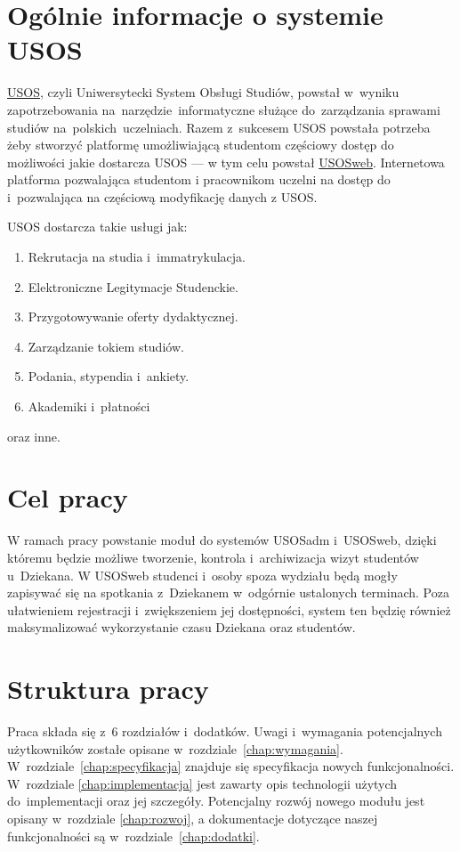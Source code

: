 \documentclass[licencjacka]{pracamgr}
\begin{document}
\section{Ogólnie informacje o systemie USOS}
\href{http://usos.edu.pl}{USOS}, czyli Uniwersytecki System Obsługi Studiów, powstał w~wyniku zapotrzebowania na~narzędzie~informatyczne służące do~zarządzania sprawami studiów na~polskich~uczelniach. Razem z~sukcesem USOS powstała potrzeba żeby stworzyć platformę umożliwiającą studentom częściowy dostęp do możliwości jakie dostarcza USOS --- w tym celu powstał \href{htpp://usosweb.uw.edu.pl}{USOSweb}. Internetowa platforma pozwalająca studentom i pracownikom uczelni na dostęp do i~pozwalająca na częściową modyfikację danych z USOS.

USOS dostarcza takie usługi jak:
\begin{enumerate}
\item Rekrutacja na studia i~immatrykulacja.
\item Elektroniczne Legitymacje Studenckie.
\item Przygotowywanie oferty dydaktycznej. 
\item Zarządzanie tokiem studiów.
\item Podania, stypendia i~ankiety.
\item Akademiki i~płatności
\end{enumerate}
oraz inne.

\section{Cel pracy}
W ramach pracy powstanie moduł do systemów USOSadm i~USOSweb, dzięki któremu będzie możliwe tworzenie, kontrola i~archiwizacja wizyt studentów u~Dziekana. W USOSweb studenci i~osoby spoza wydziału będą mogły zapisywać się na spotkania z~Dziekanem w~odgórnie ustalonych terminach. Poza ułatwieniem rejestracji i~zwiększeniem jej dostępności, system ten będzię również maksymalizować wykorzystanie czasu Dziekana oraz studentów.
\section{Struktura pracy}
Praca składa się z~6 rozdziałów i~dodatków.
Uwagi i~wymagania potencjalnych użytkowników zostałe opisane w~rozdziale~\ref{chap:wymagania}.
W~rozdziale~\ref{chap:specyfikacja} znajduje się specyfikacja nowych funkcjonalności. W~rozdziale \ref{chap:implementacja} jest zawarty opis technologii użytych do~implementacji oraz jej szczegóły. Potencjalny rozwój nowego modułu jest opisany w~rozdziale \ref{chap:rozwoj}, a dokumentacje dotyczące naszej funkcjonalności są w~rozdziale~\ref{chap:dodatki}. 
\end{document}
